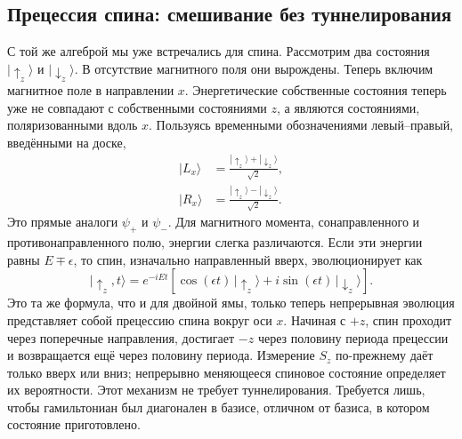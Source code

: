 \begin{classroomqa}
\end{classroomqa}

\begin{classroomqa}
\end{classroomqa}

\subsection{Прецессия спина: смешивание без туннелирования}

С той же алгеброй мы уже встречались для спина. Рассмотрим два состояния \(|\uparrow_z\rangle\) и \(|\downarrow_z\rangle\). В отсутствие магнитного поля они вырождены. Теперь включим магнитное поле в направлении \(x\). Энергетические собственные состояния теперь уже не совпадают с собственными состояниями \(z\), а являются состояниями, поляризованными вдоль \(x\). Пользуясь временными обозначениями левый--правый, введёнными на доске,
\begin{align}
|L_x\rangle &= \frac{|\uparrow_z\rangle+|\downarrow_z\rangle}{\sqrt{2}},\\
|R_x\rangle &= \frac{|\uparrow_z\rangle-|\downarrow_z\rangle}{\sqrt{2}}.
\end{align}
Это прямые аналоги \(\psi_+\) и \(\psi_-\). Для магнитного момента, сонаправленного и противонаправленного полю, энергии слегка различаются. Если эти энергии равны \(E\mp\epsilon\), то спин, изначально направленный вверх, эволюционирует как
\begin{equation}
|\uparrow_z,t\rangle
= e^{-iEt}\left[\cos(\epsilon t)\,|\uparrow_z\rangle
+ i\sin(\epsilon t)\,|\downarrow_z\rangle\right].
\end{equation}
Это та же формула, что и для двойной ямы, только теперь непрерывная эволюция представляет собой прецессию спина вокруг оси \(x\). Начиная с \(+z\), спин проходит через поперечные направления, достигает \(-z\) через половину периода прецессии и возвращается ещё через половину периода. Измерение \(S_z\) по-прежнему даёт только вверх или вниз; непрерывно меняющееся спиновое состояние определяет их вероятности. Этот механизм не требует туннелирования. Требуется лишь, чтобы гамильтониан был диагонален в базисе, отличном от базиса, в котором состояние приготовлено.

